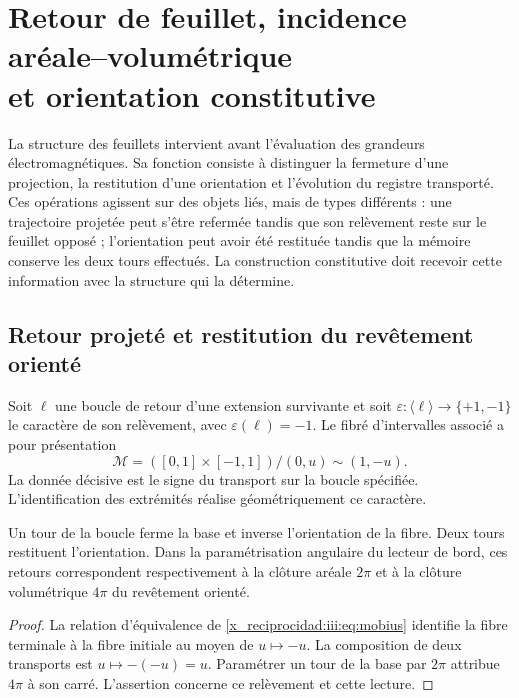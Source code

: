 

\chapter[Retour de feuillet, incidence aréale--volumétrique et orientation constitutive]{Retour de feuillet, incidence aréale--volumétrique\\et orientation constitutive}
\label{x_reciprocidad:iii:sec:hojas}
\label{x_reciprocidad:nuclear:constitutiva-antecedente}

La structure des feuillets intervient avant l’évaluation des grandeurs
électromagnétiques. Sa fonction consiste à distinguer la fermeture d’une projection,
la restitution d’une orientation et l’évolution du registre transporté.
Ces opérations agissent sur des objets liés, mais de types différents : une
trajectoire projetée peut s’être refermée tandis que son relèvement reste
sur le feuillet opposé ; l’orientation peut avoir été restituée tandis que la mémoire
conserve les deux tours effectués. La construction constitutive doit recevoir
cette information avec la structure qui la détermine.

\section{Retour projeté et restitution du revêtement orienté}

Soit $\ell$ une boucle de retour d’une extension survivante et soit
$\varepsilon:\langle\ell\rangle\to\{+1,-1\}$ le caractère de son
relèvement, avec $\varepsilon(\ell)=-1$. Le fibré d’intervalles associé
a pour présentation
\begin{equation}
 \mathcal M=([0,1]\times[-1,1])/{(0,u)\sim(1,-u)}.
 \label{x_reciprocidad:iii:eq:mobius}
\end{equation}
La donnée décisive est le signe du transport sur la boucle spécifiée.
L’identification des extrémités réalise géométriquement ce caractère.

\begin{proposition}
Un tour de la boucle ferme la base et inverse l’orientation de la fibre. Deux
tours restituent l’orientation. Dans la paramétrisation angulaire du lecteur de
bord, ces retours correspondent respectivement à la clôture aréale $2\pi$ et
à la clôture volumétrique $4\pi$ du revêtement orienté.
\end{proposition}
\begin{proof}
La relation d’équivalence de \eqref{x_reciprocidad:iii:eq:mobius} identifie la fibre terminale
à la fibre initiale au moyen de $u\mapsto-u$. La composition de deux transports est
$u\mapsto-(-u)=u$. Paramétrer un tour de la base par $2\pi$ attribue $4\pi$
à son carré. L’assertion concerne ce relèvement et cette lecture.
\end{proof}

